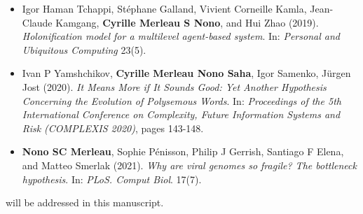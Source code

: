 \begin{itemize}
	
	\item Igor Haman Tchappi, Stéphane Galland, Vivient Corneille Kamla, Jean-Claude Kamgang, \textbf{Cyrille Merleau S Nono}, and Hui Zhao (2019). \emph{Holonification model for a multilevel agent-based system}. In: \textit{Personal and Ubiquitous Computing} 23(5).
	
	\item Ivan P Yamshchikov, \textbf{Cyrille Merleau Nono Saha}, Igor Samenko, Jürgen Jost (2020). \emph{It Means More if It Sounds Good: Yet Another Hypothesis Concerning the Evolution of Polysemous Words}. In: \textit{Proceedings of the 5th International Conference on Complexity, Future Information Systems and Risk (COMPLEXIS 2020)}, pages 143-148.
	
	\item  \textbf{Nono SC Merleau}, Sophie Pénisson, Philip J Gerrish, Santiago F Elena, and Matteo Smerlak (2021). \emph{Why are viral genomes so fragile? The bottleneck hypothesis}. In: \textit{PLoS. Comput Biol}. 17(7). %
	
	
\end{itemize}
will be addressed in this manuscript.

%
%

